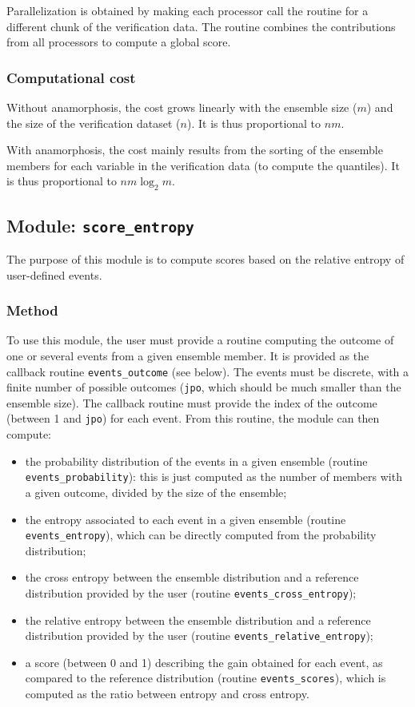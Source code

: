 \documentclass[11pt]{article}
\begin{document}
Parallelization is obtained by making each processor call the routine
for a different chunk of the verification data.
The routine combines the contributions from all processors
to compute a global score.

\subsubsection*{Computational cost}

Without anamorphosis, the cost grows linearly with the ensemble size ($m$)
and the size of the verification dataset ($n$).
It is thus proportional to $n m$.

\noindent
With anamorphosis, the cost mainly results from the sorting of the ensemble members
for each variable in the verification data (to compute the quantiles).
It is thus proportional to $n m \log_2 m$.

\subsection{Module: {\tt\bf score\_entropy}}

The purpose of this module is to compute
scores based on the relative entropy of user-defined events.

\subsubsection*{Method}

To use this module, the user must provide a routine
computing the outcome of one or several events from a given ensemble member.
It is provided as the callback routine {\tt events\_outcome} (see below).
The events must be discrete, with a finite number of possible outcomes
({\tt jpo}, which should be much smaller than the ensemble size).
The callback routine must provide the index of the outcome (between 1 and {\tt jpo}) for each event.
From this routine, the module can then compute:

\begin{itemize}
\item the probability distribution of the events in a given ensemble (routine {\tt events\_probability}):
this is just computed as the number of members with a given outcome, divided by the size of the ensemble;
\item the entropy associated to each event in a given ensemble (routine {\tt events\_entropy}),
which can be directly computed from the probability distribution;
\item the cross entropy between the ensemble distribution and a reference distribution
provided by the user (routine {\tt events\_cross\_entropy});
\item the relative entropy between the ensemble distribution and a reference distribution
provided by the user (routine {\tt events\_relative\_entropy});
\item a score (between 0 and 1) describing the gain obtained for each event,
as compared to the reference distribution (routine {\tt events\_scores}),
which is computed as the ratio between entropy and cross entropy.
\end{itemize}
\end{document}
